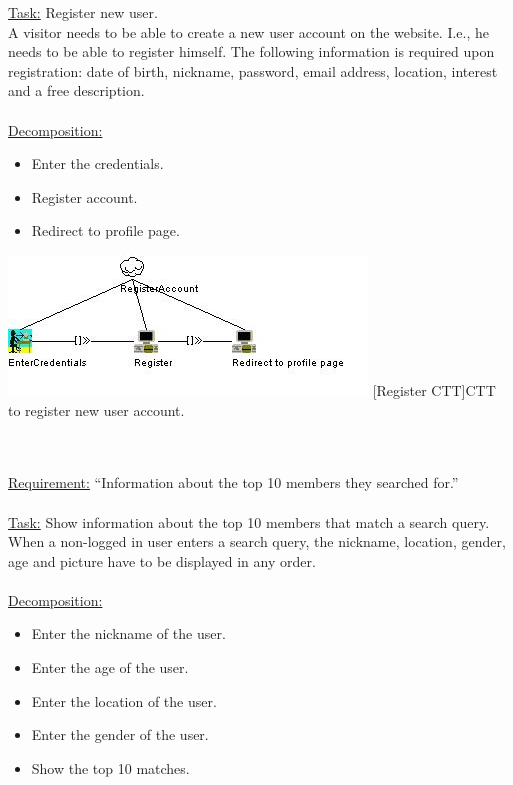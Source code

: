 \documentclass[11pt, a4paper,svglistings,oneside]{book}
\begin{document}
\underline{Task:} Register new user. \\
A visitor needs to be able to create a new user account on the website. I.e., he needs to be able to register himself. The following information is required upon registration: date of birth, nickname, password, email address, location, interest and a free description. \\ \\
\underline{Decomposition:}
\begin{itemize}
\item Enter the credentials.
\item Register account.
\item Redirect to profile page.
\end{itemize}
\noindent\begin{minipage}{\textwidth}
    \centering
   \includegraphics[width=\textwidth]{CTT_Register.png}
 [Register CTT]{CTT to register new user account.}
\end{minipage}
$\;$ \\ \\
\underline{Requirement:} ``Information about the top 10 members they searched for.'' \\ \\
\underline{Task:} Show information about the top 10 members that match a search query. \\
When a non-logged in user enters a search query, the nickname, location, gender, age and picture have to be displayed in any order. \\ \\
\underline{Decomposition:}
\begin{itemize}
\item Enter the nickname of the user.
\item Enter the age of the user.
\item Enter the location of the user.
\item Enter the gender of the user.
\item Show the top 10 matches.
\end{itemize}
\end{document}
